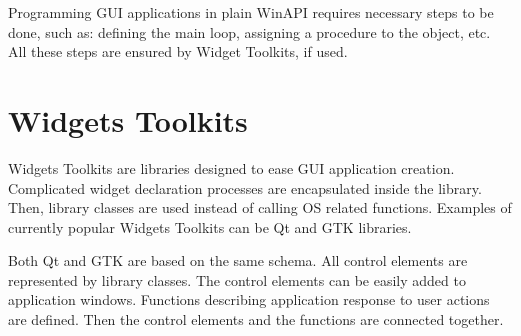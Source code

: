 Programming GUI applications in plain WinAPI requires necessary steps to be done, such as: defining the main loop, assigning a procedure to the object, etc. All these steps are ensured by Widget Toolkits, if used. 

\begin{comment}

\section{GUI programming in Windows API}
Development of GUI application for Windows is possible with Windows API. This is the name given to a set of various APIs - communication interfaces for performing services. These communication interfaces offer manipulation with file-system, devices and also creating graphic windows.

Most common parts of Windows API are:
\begin{itemize}
\item \clist{kernel32.dll}, which is needed for memory management, input/output, process and thread creation.
\item \clist{user32.dll} for creating GUI elements, such as windows, buttons, etc.
\item \clist{shell32.dll} which offers access to Windows command line
\item \clist{WinSock} to use network
\end{itemize}
\end{comment}

\section{Widgets Toolkits}
\label{guiframeworks}
Widgets Toolkits are libraries designed to ease GUI application creation. Complicated widget declaration processes are encapsulated inside the library. Then, library classes are used instead of calling OS related functions. Examples of currently popular Widgets Toolkits can be Qt and GTK libraries\cite[pages~413-416]{qtvsgtk}.

Both Qt and GTK are based on the same schema. All control elements are represented by library classes. The control elements can be easily added to application windows. Functions describing application response to user actions are defined. Then the control elements and the functions are connected together.

